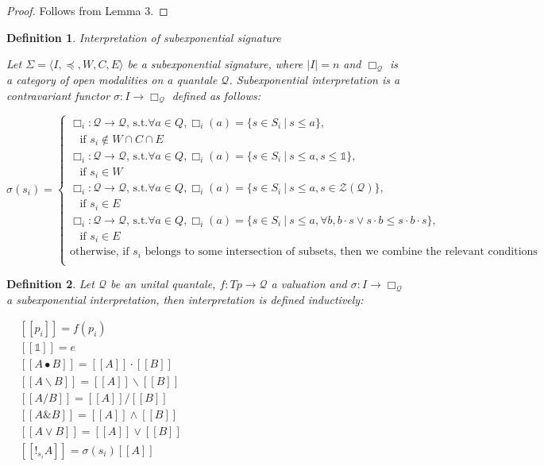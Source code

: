 \documentclass[a4paper]{article}
\theoremstyle{defin}
\newtheorem{defin}{Definition}
\theoremstyle{theorem}
\theoremstyle{prop}
\theoremstyle{lemma}
\theoremstyle{ex}
\theoremstyle{col}
\begin{document}
\begin{proof}
  Follows from Lemma 3.
\end{proof}

\begin{defin} Interpretation of subexponential signature

  Let $\Sigma = \langle I, \preceq, W, C, E \rangle$ be a subexponential signature, where $|I| = n$ and
  $\Box_{\mathcal{Q}}$ is a category of open modalities on a quantale $\mathcal{Q}$.
  Subexponential interpretation is a contravariant functor $\sigma : I \to \Box_{\mathcal{Q}}$ defined as follows:

  $\sigma(s_i) = \begin{cases}
  \Box_i : \mathcal{Q} \to \mathcal{Q} \text{, s.t.} \forall a \in Q, \Box_i(a) = \{ s \in S_i \: | \: s \leq a\},
  \\ \:\:\:\: \text{if $s_i \notin W \cap C \cap E$} \\
  \Box_i : \mathcal{Q} \to \mathcal{Q} \text{, s.t.} \forall a \in Q, \Box_i(a) = \{ s \in S_i \: | \: s \leq a, s \leq \mathds{1}\},
  \\ \:\:\:\: \text{if $s_i \in W$} \\
  \Box_i : \mathcal{Q} \to \mathcal{Q} \text{, s.t.} \forall a \in Q, \Box_i(a) = \{ s \in S_i \: | \: s \leq a, s \in \mathcal{Z}(\mathcal{Q}) \},
  \\ \:\:\:\: \text{if $s_i \in E$} \\
  \Box_i : \mathcal{Q} \to \mathcal{Q} \text{, s.t.} \forall a \in Q, \Box_i(a) = \{ s \in S_i \: | \: s \leq a, \forall b, b \cdot s \vee s \cdot b \leq s \cdot b \cdot s \},
  \\ \:\:\:\: \text{if $s_i \in E$} \\
  \text{otherwise, if $s_i$ belongs to some intersection of subsets, then we combine the relevant conditions } \\
  \end{cases}$
\end{defin}

\begin{defin} Let $\mathcal{Q}$ be an unital quantale, $f : Tp \to \mathcal{Q}$ a valuation and $\sigma : I \to \Box_{\mathcal{Q}}$ a subexponential interpretation, then
  interpretation is defined inductively:

\begin{center}
$\begin{array}{lll}
& [\![p_i]\!] = f(p_i)&\\
& [\![\mathds{1}]\!] = e & \\
&[\![A \bullet B]\!] = [\![A]\!] \cdot [\![B]\!] & \\
&[\![A \backslash B]\!] = [\![A]\!] \backslash [\![B]\!] & \\
&[\![A / B]\!] = [\![A]\!] / [\![B]\!]& \\
&[\![A \& B]\!] = [\![A]\!] \wedge [\![B]\!]& \\
&[\![A \vee B]\!] = [\![A]\!] \vee [\![B]\!]& \\
&[\![!_{s_i} A]\!] = \sigma(s_i) [\![A]\!]&
\end{array}$
\end{center}
\end{defin}
\end{document}

